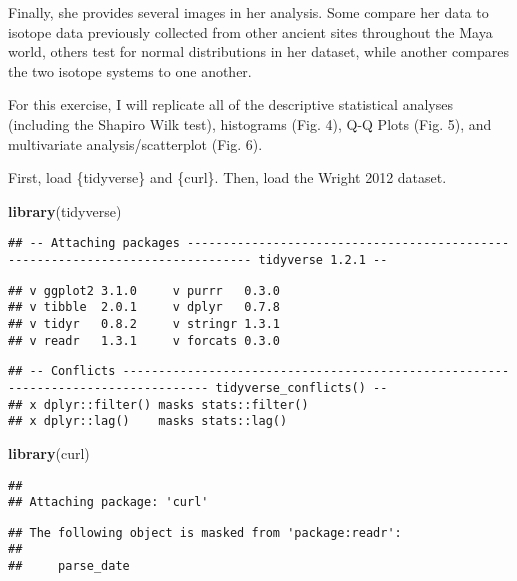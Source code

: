 \documentclass[]{article}
\newenvironment{Shaded}{\begin{snugshade}}{\end{snugshade}}
\newcommand{\KeywordTok}[1]{\textcolor[rgb]{0.13,0.29,0.53}{\textbf{#1}}}
\newcommand{\NormalTok}[1]{#1}
\begin{document}
Finally, she provides several images in her analysis. Some compare her
data to isotope data previously collected from other ancient sites
throughout the Maya world, others test for normal distributions in her
dataset, while another compares the two isotope systems to one another.

For this exercise, I will replicate all of the descriptive statistical
analyses (including the Shapiro Wilk test), histograms (Fig. 4), Q-Q
Plots (Fig. 5), and multivariate analysis/scatterplot (Fig. 6).

First, load \{tidyverse\} and \{curl\}. Then, load the Wright 2012
dataset.

\begin{Shaded}
\begin{Highlighting}[]
\KeywordTok{library}\NormalTok{(tidyverse)}
\end{Highlighting}
\end{Shaded}

\begin{verbatim}
## -- Attaching packages ------------------------------------------------------------------------------- tidyverse 1.2.1 --
\end{verbatim}

\begin{verbatim}
## v ggplot2 3.1.0     v purrr   0.3.0
## v tibble  2.0.1     v dplyr   0.7.8
## v tidyr   0.8.2     v stringr 1.3.1
## v readr   1.3.1     v forcats 0.3.0
\end{verbatim}

\begin{verbatim}
## -- Conflicts ---------------------------------------------------------------------------------- tidyverse_conflicts() --
## x dplyr::filter() masks stats::filter()
## x dplyr::lag()    masks stats::lag()
\end{verbatim}

\begin{Shaded}
\begin{Highlighting}[]
\KeywordTok{library}\NormalTok{(curl)}
\end{Highlighting}
\end{Shaded}

\begin{verbatim}
## 
## Attaching package: 'curl'
\end{verbatim}

\begin{verbatim}
## The following object is masked from 'package:readr':
## 
##     parse_date
\end{verbatim}
\end{document}
